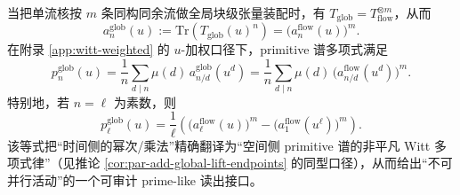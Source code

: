 \begin{remark}
当把单流核按 $m$ 条同构同余流做全局块级张量装配时，有 $T_{\mathrm{glob}}=T_{\mathrm{flow}}^{\otimes m}$，从而
\[
a_n^{\mathrm{glob}}(u):=\mathrm{Tr}(T_{\mathrm{glob}}(u)^n)=\bigl(a_n^{\mathrm{flow}}(u)\bigr)^m.
\]
在附录 \ref{app:witt-weighted} 的 $u$-加权口径下，primitive 谱多项式满足
\[
p_n^{\mathrm{glob}}(u)=\frac{1}{n}\sum_{d\mid n}\mu(d)\,a_{n/d}^{\mathrm{glob}}(u^d)
=\frac{1}{n}\sum_{d\mid n}\mu(d)\,\bigl(a_{n/d}^{\mathrm{flow}}(u^d)\bigr)^m.
\]
特别地，若 $n=\ell$ 为素数，则
\[
p_\ell^{\mathrm{glob}}(u)=\frac{1}{\ell}\left(\bigl(a_\ell^{\mathrm{flow}}(u)\bigr)^m-\bigl(a_1^{\mathrm{flow}}(u^\ell)\bigr)^m\right).
\]
该等式把“时间侧的幂次/乘法”精确翻译为“空间侧 primitive 谱的非平凡 Witt 多项式律”（见推论 \ref{cor:par-add-global-lift-endpoints} 的同型口径），从而给出“不可并行活动”的一个可审计 prime-like 读出接口。
\end{remark}
